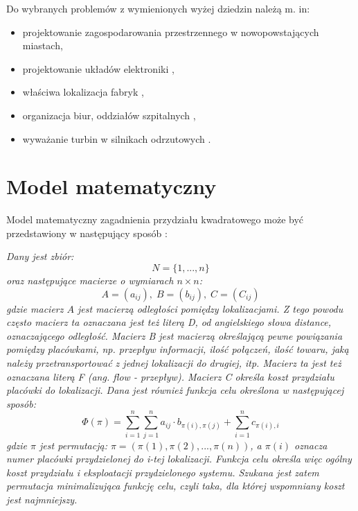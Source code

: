 Do wybranych problemów z wymienionych wyżej dziedzin należą m. in:
\begin{itemize}
\item projektowanie zagospodarowania przestrzennego w nowopowstających miastach,
\item projektowanie układów elektroniki \cite{QAP_DEF_CHMIEL},
\item właściwa lokalizacja fabryk \cite{QAP_DEF_CHMIEL},
\item organizacja biur, oddziałów szpitalnych \cite{QAP_DEF_CHMIEL},
\item wyważanie turbin w silnikach odrzutowych  \cite{QAP_DEF_CHMIEL}.
\end{itemize}

\section{Model matematyczny}
\label{sec:model}
Model matematyczny zagadnienia przydziału kwadratowego może być przedstawiony w następujący sposób \cite{QAP_DEF_CHMIEL}:

\textit{Dany jest zbiór:}
\newline
\begin{equation}
N=\{1,...,n\}
\end{equation}
\newline
\textit{oraz następujące macierze o wymiarach $n\times n$:}
\newline
\begin{equation}
A=(a_{ij}),\; B=(b_{ij}),\; C=(C_{ij})
\end{equation}
\newline
\textit{gdzie macierz $A$ jest macierzą odległości pomiędzy lokalizacjami. Z tego powodu często macierz ta oznaczana jest też literą D, od angielskiego słowa distance, oznaczającego odległość. Macierz B jest macierzą określającą pewne powiązania pomiędzy placówkami, np. przepływ informacji, ilość połączeń, ilość towaru, jaką należy przetransportować z jednej lokalizacji do drugiej, itp. Macierz ta jest też oznaczana literą F (ang. flow - przepływ). Macierz C określa  koszt przydziału  placówki do lokalizacji.
Dana jest również funkcja celu określona w następującej sposób:}
\newline
\begin{equation}
\label{QAP_FC}
\Phi(\pi)=\sum_{i=1}^n\sum_{j=1}^n a_{ij}\cdot b_{\pi(i),\pi(j)} + \sum_{i=1}^n c_{\pi(i),i}
\end{equation}
\newline
\textit{gdzie $\pi$ jest permutacją: $\pi=(\pi(1),\pi(2),...,\pi(n))$, a $\pi(i)$ oznacza numer placówki przydzielonej do {i-tej} lokalizacji. Funkcja celu określa więc ogólny koszt przydziału i eksploatacji przydzielonego systemu. Szukana jest zatem permutacja minimalizująca funkcję celu, czyli taka, dla której wspomniany koszt jest najmniejszy.}

